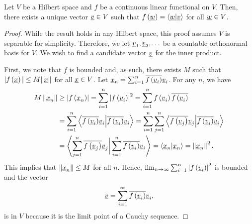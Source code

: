 \begin{theorem}[Riesz] \label{theorem:FunctionalInnerProduct}
Let $V$ be a Hilbert space and $f$ be a continuous linear functional on $V$.
Then, there exists a unique vector $\underline{v} \in V$ such that $f \left( \underline{w} \right) = \left\langle \underline{w} | \underline{v} \right\rangle$ for all $\underline{w} \in V$.
\end{theorem}
\begin{proof}
While the result holds in any Hilbert space, this proof assumes $V$ is separable for simplicity.
Therefore, we let $\underline{v}_1, \underline{v}_2, \ldots$ be a countable orthonormal basis for $V$.
We wish to find a candidate vector $\underline{v}$ for the inner product.

First, we note that $f$ is bounded and, as such, there exists $M$ such that $| f \left( \underline{x} \right) | \leq M \| \underline{x} \|$ for all $\underline{x} \in V$.
Let $\underline{x}_n = \sum_{i=1}^n \overline{ f \left( \underline{v}_i \right) } \underline{v}_i$.
For any $n$, we have
\begin{equation*}
\begin{split}
M \left\| \underline{x}_n \right\| &\geq \left| f \left( \underline{x}_n \right) \right|
= \sum_{i=1}^n \left| f \left( \underline{v}_i \right) \right|^2
= \sum_{i=1}^n f \left( \underline{v}_i \right)
\overline{ f \left( \underline{v}_i \right) } \\
&= \sum_{i=1}^n \left\langle \overline{ f \left( \underline{v}_i \right) } \underline{v}_i
\Big| \overline{ f \left( \underline{v}_i \right) } \underline{v}_i \right\rangle
= \sum_{i=1}^n \sum_{j=1}^n
\left\langle \overline{ f \left( \underline{v}_j \right) } \underline{v}_j
\Big| \overline{ f \left( \underline{v}_i \right) } \underline{v}_i \right\rangle \\
&= \left\langle \sum_{j=1}^n
\overline{ f \left( \underline{v}_j \right) } \underline{v}_j
\bigg| \sum_{i=1}^n
\overline{ f \left( \underline{v}_i \right) } \underline{v}_i \right\rangle
= \left\langle \underline{x}_n | \underline{x}_n \right\rangle
= \left\| \underline{x}_n \right\|^2 .
\end{split}
\end{equation*}
This implies that $\| \underline{x}_n \| \leq M$ for all $n$.
Hence, $\lim_{n \rightarrow \infty} \sum_{i=1}^n \left| f \left( \underline{v}_i \right) \right|^2$ is bounded and the vector
\begin{equation*}
\underline{v} = \sum_{i=1}^{\infty} \overline{ f \left( \underline{v}_i \right) } \underline{v}_i ,
\end{equation*}
is in $V$ because it is the limit point of a Cauchy sequence.

\end{proof}
